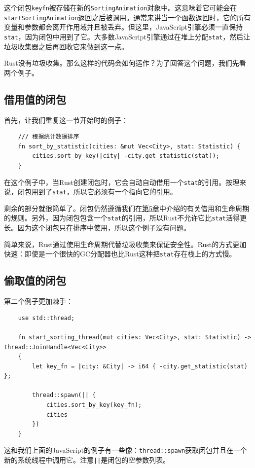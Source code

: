 这个闭包\texttt{keyfn}被存储在新的\texttt{SortingAnimation}对象中。这意味着它可能会在\texttt{startSortingAnimation}返回之后被调用。通常来讲当一个函数返回时，它的所有变量和参数都会离开作用域并且被丢弃。但这里，JavaScript引擎必须一直保持\texttt{stat}，因为闭包中用到了它。大多数JavaScript引擎通过在堆上分配\texttt{stat}，然后让垃圾收集器之后再回收它来做到这一点。

Rust没有垃圾收集。那么这样的代码会如何运作？为了回答这个问题，我们先看两个例子。

\subsection{借用值的闭包}
首先，让我们重复这一节开始时的例子：
\begin{verbatim}
    /// 根据统计数据排序
    fn sort_by_statistic(cities: &mut Vec<City>, stat: Statistic) {
        cities.sort_by_key(|city| -city.get_statistic(stat));
    }
\end{verbatim}

在这个例子中，当Rust创建闭包时，它会自动自动借用一个\texttt{stat}的引用。按理来说，闭包用到了\texttt{stat}，所以它必须有一个指向它的引用。

剩余的部分就很简单了。闭包仍然遵循我们在\hyperref[ch05]{第5章}中介绍的有关借用和生命周期的规则。另外，因为闭包包含一个\texttt{stat}的引用，所以Rust不允许它比\texttt{stat}活得更长。因为这个闭包只在排序中使用，所以这个例子没有问题。

简单来说，Rust通过使用生命周期代替垃圾收集来保证安全性。Rust的方式更加快速：即使是一个很快的GC分配器也比Rust这种把\texttt{stat}存在栈上的方式慢。

\subsection{偷取值的闭包}
第二个例子更加棘手：
\begin{verbatim}
    use std::thread;

    fn start_sorting_thread(mut cities: Vec<City>, stat: Statistic) -> thread::JoinHandle<Vec<City>>
    {
        let key_fn = |city: &City| -> i64 { -city.get_statistic(stat) };

        thread::spawn(|| {
            cities.sort_by_key(key_fn);
            cities
        })
    }
\end{verbatim}

这和我们上面的JavaScript的例子有一些像：\texttt{thread::spawn}获取闭包并且在一个新的系统线程中调用它。注意\texttt{||}是闭包的空参数列表。


